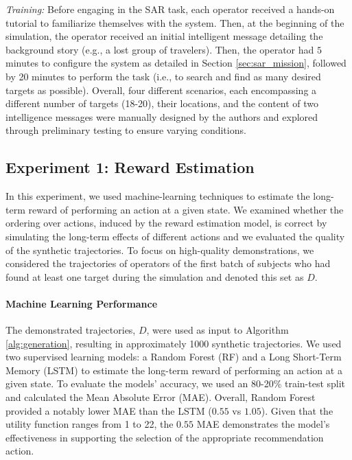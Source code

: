 
\noindent\textit{Training:}
Before engaging in the SAR task, each operator received a hands-on tutorial to familiarize themselves with the system. Then, at the beginning of the simulation, the operator received an initial intelligent message detailing the background story (e.g., a lost group of travelers). Then, the operator had $5$ minutes to configure the system as detailed in Section \ref{sec:sar_mission}, followed by 20 minutes to perform the task (i.e., to search and find as many desired targets as possible). 
Overall, four different scenarios, each encompassing a different number of targets (18-20), their locations, and the content of two intelligence messages were manually designed by the authors and explored through preliminary testing to ensure varying conditions. 

\subsection{Experiment 1: Reward Estimation}
In this experiment, we used machine-learning techniques to estimate the long-term reward of performing an action at a given state. We examined whether the ordering over actions, induced by the reward estimation model, is correct by simulating the long-term effects of different actions and we evaluated the quality of the synthetic trajectories.
To focus on high-quality demonstrations, we considered the trajectories of operators of the first batch of subjects who had found at least one target during the simulation and denoted this set as $D$. 

\paragraph{\bf Machine Learning Performance}%
\label{modules_evaluation}
The demonstrated trajectories, $D$, were used as input to Algorithm \ref{alg:generation}, resulting in approximately 1000 synthetic trajectories. 
We used two supervised learning models: a Random Forest (RF) \cite{randomForest} and a Long Short-Term Memory (LSTM) \cite{LSTM} to estimate the long-term reward of performing an action at a given state. To evaluate the models' accuracy, we used an 80-20\% train-test split and calculated the Mean Absolute Error (MAE). 
Overall, Random Forest provided a notably lower MAE than the LSTM ($0.55$ vs $1.05$).
Given that the utility function ranges from 1 to 22, the $0.55$ MAE demonstrates the model's effectiveness in supporting the selection of the appropriate recommendation action.

